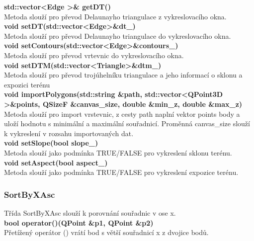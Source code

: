 \documentclass[a4paper, 12pt]{article}
\begin{document}
\textbf{std::vector\textless Edge \textgreater \& getDT()}\\
Metoda slouží pro převod Delaunayho triangulace z vykreslovacího okna.\\

\textbf{void setDT(std::vector\textless Edge\textgreater \&dt\_)}\\
Metoda slouží pro převod Delaunayho triangulace do vykreslovacího okna.\\

\textbf{void setContours(std::vector\textless Edge\textgreater\&contours\_)}\\
Metoda slouží pro převod vrtevnic do vykreslovacího okna.\\

\textbf{void setDTM(std::vector\textless Triangle\textgreater \&dtm\_)}\\
Metoda slouží pro převod trojúhelníku triangulace a jeho informací o sklonu a expozici terénu\\

\textbf{void importPolygons(std::string \&path, std::vector\textless QPoint3D \textgreater \&points,  QSizeF \&canvas\_size, double \&min\_z, double \&max\_z)}\\
Metoda slouží pro import vrstevnic, z cesty path naplní vektor points body a uloží hodnotu s minimální a maximální souřadnicí. Proměnná canvas\_size slouží k vykreslení v rozsahu importovaných dat.\\

\textbf{void setSlope(bool slope\_)}\\
Metoda slouží jako podmínka TRUE/FALSE pro vykreslení sklonu terénu.\\

\textbf{void setAspect(bool aspect\_)}\\
Metoda slouží jako podmínka TRUE/FALSE pro vykreslení expozice terénu.\\



\subsubsection{SortByXAsc}
Třída SortByXAsc slouží k porovnání souřadnic v ose x.\\


\textbf{bool operator()(QPoint \&p1, QPoint \&p2)}\\
Přetížený operátor () vrátí bod s větší souřadnicí x z dvojice bodů.\\
\end{document}

